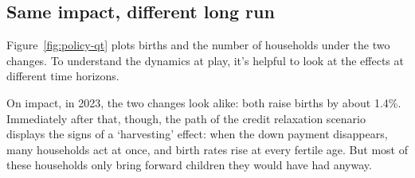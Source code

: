 \subsection{Same impact, different long run}
\label{sec:policy-supply}

Figure~\ref{fig:policy-qt} plots births and the number of households under
the two changes. To understand the dynamics at play, it's helpful to look at the effects at different time horizons.

On impact, in 2023, the two changes look alike: both raise births by about
1.4\%. Immediately after that, though, the path of the credit relaxation scenario displays the signs of a `harvesting'
effect: when the down payment disappears, many households act at once, and
birth rates rise at every fertile age. But most of these households only bring
forward children they would have had anyway.

